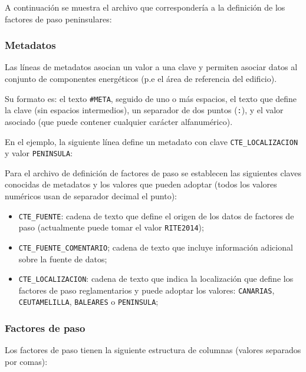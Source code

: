 \documentclass[10pt,notitlepage,oneside,a4paper]{article}
\begin{document}
A continuación se muestra el archivo que correspondería a la definición de los factores de paso peninsulares:



\subsubsection{Metadatos}

Las líneas de metadatos asocian un valor a una clave y permiten asociar datos al conjunto de componentes energéticos (p.e el área de referencia del edificio).

Su formato es: el texto \texttt{\#META}, seguido de uno o más espacios, el texto que define la clave (sin espacios intermedios), un separador de dos puntos (\texttt{:}), y el valor asociado (que puede contener cualquier carácter alfanumérico).

En el ejemplo, la siguiente línea define un metadato con clave \texttt{CTE\_LOCALIZACION} y valor \texttt{PENINSULA}:



Para el archivo de definición de factores de paso se establecen las siguientes claves conocidas de metadatos y los valores que pueden adoptar (todos los valores numéricos usan de separador decimal el punto):

\begin{itemize}
\item \texttt{CTE\_FUENTE}: cadena de texto que define el origen de los datos de factores de paso (actualmente puede tomar el valor \texttt{RITE2014});
\item \texttt{CTE\_FUENTE\_COMENTARIO}; cadena de texto que incluye información adicional sobre la fuente de datos;
\item \texttt{CTE\_LOCALIZACION}: cadena de texto que indica la localización que define los factores de paso reglamentarios y puede adoptar los valores: \texttt{CANARIAS}, \texttt{CEUTAMELILLA}, \texttt{BALEARES} o \texttt{PENINSULA};
\end{itemize}

\subsubsection{Factores de paso}

Los factores de paso tienen la siguiente estructura de columnas (valores separados por comas):
\end{document}
